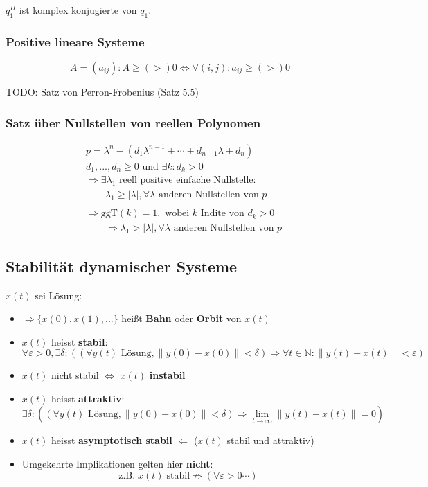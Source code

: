 \documentclass[a4paper]{article}
\begin{document}
$q_1 ^{H}$ ist komplex konjugierte von $q_1$.

\subsubsection{Positive lineare Systeme}
\[
	A = (a_{ij}):
	A \geq (>) 0 \Leftrightarrow \forall (i, j): a_{ij} \geq (>) 0
\] 

TODO: Satz von Perron-Frobenius (Satz 5.5)

\subsubsection{Satz über Nullstellen von reellen Polynomen}
\begin{align*}
	& p = \lambda ^{n} - \left(
		d_1 \lambda ^{n-1} + \cdots + d_{n-1} \lambda + d_n
	\right) \\
	& d_1, ..., d_n \geq 0 \text{ und } 
	\exists k: d_k > 0 \\
	&\Rightarrow \exists \lambda_1 \text{ reell positive einfache Nullstelle}: \\
	& \qquad \lambda_1 \geq | \lambda |, 
	\forall \lambda \text{ anderen Nullstellen von } p \\
	& \\
	&\Rightarrow \text{ggT} ( k ) = 1, \text{ wobei }
	k \text{ Indite von } d_k > 0 \\
	& \qquad \Rightarrow \lambda_1 > | \lambda |, 
	\forall \lambda \text{ anderen Nullstellen von } p
\end{align*}

\subsection{Stabilität dynamischer Systeme}
$x(t)$ sei Lösung:

\begin{itemize}
	\item $\Rightarrow \{
			x(0), x(1), ...
		\} $ heißt \textbf{Bahn} oder \textbf{Orbit} von $x(t)$
	\item $x(t)$ heisst \textbf{stabil}:
		\[
		\forall \varepsilon > 0, \exists \delta :
		\left(
			(
				\forall y(t) \text{ Lösung}, \| y(0) - x(0) \| < \delta
			)
			\Rightarrow \forall t \in \mathbb{N}:
			\| y(t) - x(t) \| < \varepsilon
		\right) 
		\] 
	\item $x(t)$ nicht stabil $\Leftrightarrow$ $x(t)$ \textbf{instabil} 
	\item $x(t)$ heisst \textbf{attraktiv}:
		\[
		\exists \delta : \left(
			(
				\forall y(t) \text{ Lösung}, \| y(0) - x(0) \| < \delta
			)
			\Rightarrow \lim_{t \to \infty} 
			\| y(t) - x(t) \| = 0
		\right) 
		\] 
	\item $x(t)$ heisst \textbf{asymptotisch stabil} 
		$\Leftarrow$ ($x(t)$ stabil und attraktiv)
	\item Umgekehrte Implikationen gelten hier \textbf{nicht}:
		\[
			\text{z.B.} \; x(t) \; \text{stabil} \nRightarrow
			\left(
				\forall \varepsilon > 0 \cdots
			\right) 
		\] 
\end{itemize}
\end{document}
